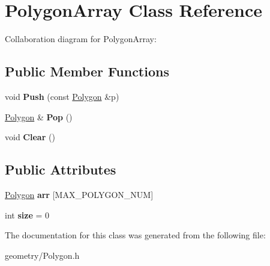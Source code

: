 \hypertarget{class_polygon_array}{}\section{Polygon\+Array Class Reference}
\label{class_polygon_array}


Collaboration diagram for Polygon\+Array\+:
\subsection*{Public Member Functions}
\begin{DoxyCompactItemize}
\item 
\mbox{\label{class_polygon_array_a333428cbdfcb87eb440f3432676f451d}} 
void {\bfseries Push} (const \mbox{\hyperlink{class_polygon}{Polygon}} \&p)
\item 
\mbox{\label{class_polygon_array_a9267ce185f4c7f531a97ae34dc0ca3be}} 
\mbox{\hyperlink{class_polygon}{Polygon}} \& {\bfseries Pop} ()
\item 
\mbox{\label{class_polygon_array_a70414ec458869e24c2e4445580645e3c}} 
void {\bfseries Clear} ()
\end{DoxyCompactItemize}
\subsection*{Public Attributes}
\begin{DoxyCompactItemize}
\item 
\mbox{\label{class_polygon_array_aa0414a7a6512a73053e4f159e923720b}} 
\mbox{\hyperlink{class_polygon}{Polygon}} {\bfseries arr} \mbox{[}M\+A\+X\+\_\+\+P\+O\+L\+Y\+G\+O\+N\+\_\+\+N\+UM\mbox{]}
\item 
\mbox{\label{class_polygon_array_a59e553a53cec4121b3105ecb31e72790}} 
int {\bfseries size} = 0
\end{DoxyCompactItemize}


The documentation for this class was generated from the following file\+:\begin{DoxyCompactItemize}
\item 
geometry/Polygon.\+h\end{DoxyCompactItemize}
